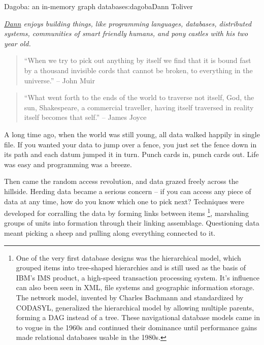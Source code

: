 \begin{aosachapter}{Dagoba: an in-memory graph database}{s:dagoba}{Dann Toliver}

\emph{\href{https://twitter.com/dann}{Dann} enjoys building things, like
programming languages, databases, distributed systems, communities of
smart friendly humans, and pony castles with his two year old.}

\begin{quote}
``When we try to pick out anything by itself we find that it is bound
fast by a thousand invisible cords that cannot be broken, to everything
in the universe.'' -- John Muir
\end{quote}

\begin{quote}
``What went forth to the ends of the world to traverse not itself, God,
the sun, Shakespeare, a commercial traveller, having itself traversed in
reality itself becomes that self.'' -- James Joyce
\end{quote}

A long time ago, when the world was still young, all data walked happily
in single file. If you wanted your data to jump over a fence, you just
set the fence down in its path and each datum jumped it in turn. Punch
cards in, punch cards out. Life was easy and programming was a breeze.

Then came the random access revolution, and data grazed freely across
the hillside. Herding data became a serious concern -- if you can access
any piece of data at any time, how do you know which one to pick next?
Techniques were developed for corralling the data by forming links
between items \footnote{One of the very first database designs was the
  hierarchical model, which grouped items into tree-shaped hierarchies
  and is still used as the basis of IBM's IMS product, a high-speed
  transaction processing system. It's influence can also been seen in
  XML, file systems and geographic information storage. The network
  model, invented by Charles Bachmann and standardized by CODASYL,
  generalized the hierarchical model by allowing multiple parents,
  forming a DAG instead of a tree. These navigational database models
  came in to vogue in the 1960s and continued their dominance until
  performance gains made relational databases usable in the 1980s.},
marshaling groups of units into formation through their linking
assemblage. Questioning data meant picking a sheep and pulling along
everything connected to it.


\end{aosachapter}
